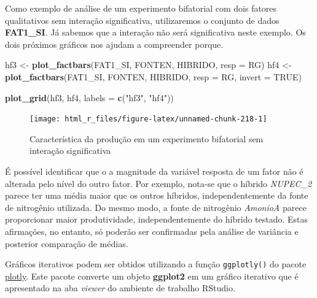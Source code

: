 \documentclass[
]{book}
\newenvironment{Shaded}{\begin{snugshade}}{\end{snugshade}}
\newcommand{\DataTypeTok}[1]{\textcolor[rgb]{0.13,0.29,0.53}{#1}}
\newcommand{\KeywordTok}[1]{\textcolor[rgb]{0.13,0.29,0.53}{\textbf{#1}}}
\newcommand{\NormalTok}[1]{#1}
\newcommand{\OtherTok}[1]{\textcolor[rgb]{0.56,0.35,0.01}{#1}}
\newcommand{\StringTok}[1]{\textcolor[rgb]{0.31,0.60,0.02}{#1}}
\begin{document}
Como exemplo de análise de um experimento bifatorial com dois fatores qualitativos sem interação  significativa, utilizaremos o conjunto de dados \textbf{FAT1\_SI}. Já sabemos que a interação não será significativa neste exemplo. Os dois próximos gráficos nos ajudam a compreender porque.

\begin{Shaded}
\begin{Highlighting}[]
\NormalTok{hf3 <-}\StringTok{ }\KeywordTok{plot_factbars}\NormalTok{(FAT1_SI,}
\NormalTok{                     FONTEN,}
\NormalTok{                     HIBRIDO,}
                     \DataTypeTok{resp =}\NormalTok{ RG)}
\NormalTok{hf4 <-}\StringTok{ }\KeywordTok{plot_factbars}\NormalTok{(FAT1_SI,}
\NormalTok{                     FONTEN,}
\NormalTok{                     HIBRIDO,}
                     \DataTypeTok{resp =}\NormalTok{ RG,}
                     \DataTypeTok{invert =} \OtherTok{TRUE}\NormalTok{)}

\KeywordTok{plot_grid}\NormalTok{(hf3, hf4, }\DataTypeTok{labels =} \KeywordTok{c}\NormalTok{(}\StringTok{"hf3"}\NormalTok{, }\StringTok{"hf4"}\NormalTok{))}
\end{Highlighting}
\end{Shaded}

\begin{figure}

{\centering \texttt{[image: html\_r\_files/figure-latex/unnamed-chunk-218-1]} 

}

\caption{Característica da produção em um experimento bifatorial sem interação significativa}\label{fig:unnamed-chunk-218}
\end{figure}

É possível identificar que o a magnitude da variável resposta de um fator não é alterada pelo nível do outro fator. Por exemplo, nota-se que o híbrido \emph{NUPEC\_2} parece ter uma média maior que os outros híbridos, independentemente da fonte de nitrogênio utilizada. Do mesmo modo, a fonte de nitrogênio \emph{AmonioA} parece proporcionar maior produtividade, independentemente do híbrido testado. Estas afirmações, no entanto, só poderão ser confirmadas pela análise de variância e posterior comparação de médias.

\begin{dica}
Gráficos iterativos podem ser obtidos utilizando a função \texttt{ggplotly()} do pacote \href{https://plot.ly/ggplot2/}{plotly}. Este pacote converte um objeto \textbf{ggplot2} em um gráfico iterativo que é apresentado na aba \emph{viewer} do ambiente de trabalho RStudio.
\end{dica}
\end{document}
